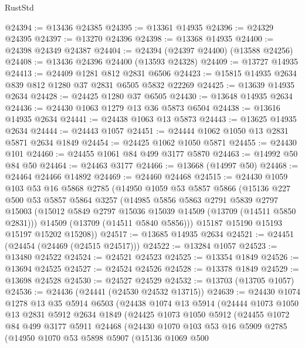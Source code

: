\begin{lexlean}{RustStd}
\begin{coremodule}
@24394 := @13436 @24385
@24395 := @13361 @14935
@24396 := @24329 @24395
@24397 := @13270 @24396
@24398 := @13368 @14935
@24400 := @24398 @24349 @24387
@24404 := @24394 (@24397 @24400) (@13588 @24256)
@24408 := @13436 @24396 @24400 (@13593 @24328)
@24409 := @13727 @14935
@24413 := @24409 @1281 @812 @2831 @6506
@24423 := @15815 @14935 @2634 @839 @812 @1280 @37 @2831 @6505 @5832 @22269
@24425 := @13639 @14935 @2634
@24428 := @24425 @1280 @37 @6505
@24430 := @13648 @14935 @2634
@24436 := @24430 @1063 @1279 @13 @36 @5873 @6504
@24438 := @13616 @14935 @2634
@24441 := @24438 @1063 @13 @5873
@24443 := @13625 @14935 @2634
@24444 := @24443 @1057
@24451 := @24444 @1062 @1050 @13 @2831 @5871 @2634 @1849
@24454 := @24425 @1062 @1050 @5871
@24455 := @24430 @101
@24460 := @24455 @1061 @84 @499 @3177 @5870
@24463 := @14992 @50 @84 @50
@24464 := @24463 @3177
@24466 := @13668 (@14997 @50)
@24468 := @24464 @24466 @14892
@24469 := @24460 @24468
@24515 := @24430
    @1059
    @103
    @53
    @16
    @5868
    @2785
    (@14950
      @1059
      @53
      @5857
      @5866
      (@15136
        @227
        @500
        @53
        @5857
        @5864
        @3257
        (@14985
          @5856
          @5863
          @2791
          @5839
          @2797
          @15003
          (@15012 @5849 @2797 @15036 @15039 @14509 (@13709 (@14511 @5850 @2831)))
          @14509
          (@13709 (@14511 @5840 @5856)))
        @15187
        @15190
        @15193
        @15197
        @15202
        @15208))
@24517 := @13685 @14935 @2634
@24521 := @24451 (@24454 (@24469 (@24515 @24517)))
@24522 := @13284 @1057
@24523 := @13480 @24522
@24524 := @24521 @24523
@24525 := @13354 @1849
@24526 := @13694 @24525
@24527 := @24524 @24526
@24528 := @13378 @1849
@24529 := @13698 @24528
@24530 := @24527 @24529
@24532 := @13703 (@13705 @1057)
@24536 := @24436 (@24441 (@24530 @24532 @13715))
@24639 := @24430
    @1074
    @1278
    @13
    @35
    @5914
    @6503
    (@24438
      @1074
      @13
      @5914
      (@24444
        @1073
        @1050
        @13
        @2831
        @5912
        @2634
        @1849
        (@24425
          @1073
          @1050
          @5912
          (@24455
            @1072
            @84
            @499
            @3177
            @5911
            @24468
            (@24430
              @1070
              @103
              @53
              @16
              @5909
              @2785
              (@14950
                @1070
                @53
                @5898
                @5907
                (@15136
                  @1069
                  @500

\end{coremodule}
\end{lexlean}
